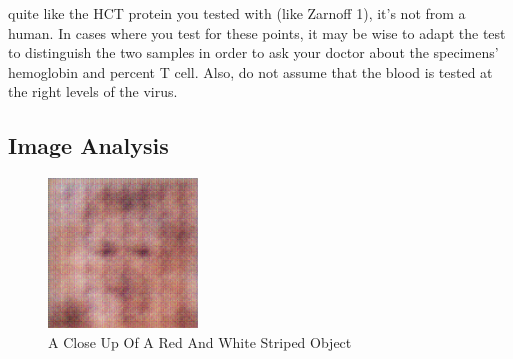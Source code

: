 \documentclass{article}%
\begin{document}
quite like the HCT protein you tested with (like Zarnoff 1), it's not from a human. In cases where you test for these points, it may be wise to adapt the test to distinguish the two samples in order to ask your doctor about the specimens' hemoglobin and percent T cell. Also, do not assume that the blood is tested at the right levels of the virus.

%
\subsection{Image Analysis}%
\label{subsec:ImageAnalysis}%


\begin{figure}[h!]%
\centering%
\includegraphics[width=150px]{500_fake_images/samples_5_18.png}%
\caption{A Close Up Of A Red And White Striped Object}%
\end{figure}

%
\end{document}

